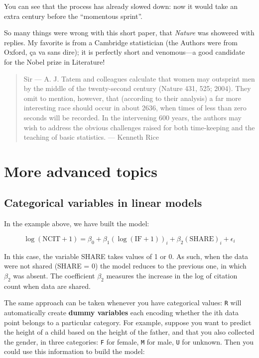 \documentclass[
  letterpaper,
  DIV=11,
  numbers=noendperiod]{scrreprt}
\begin{document}
You can see that the process has already slowed down: now it would take
an extra century before the ``momentous sprint''.

So many things were wrong with this short paper, that \emph{Nature} was
showered with replies. My favorite is from a Cambridge statistician (the
Authors were from Oxford, ça va sans dire); it is perfectly short and
venomous---a good candidate for the Nobel prize in Literature!

\begin{quote}
Sir --- A. J. Tatem and colleagues calculate that women may outsprint
men by the middle of the twenty-second century (Nature 431, 525; 2004).
They omit to mention, however, that (according to their analysis) a far
more interesting race should occur in about 2636, when times of less
than zero seconds will be recorded. In the intervening 600 years, the
authors may wish to address the obvious challenges raised for both
time-keeping and the teaching of basic statistics. --- Kenneth Rice
\end{quote}

\section{More advanced topics}\label{more-advanced-topics}

\subsection{Categorical variables in linear
models}\label{categorical-variables-in-linear-models}

In the example above, we have built the model:

\[
 \log(\text{NCIT} + 1) = \beta_0 + \beta_1 (\log(\text{IF} + 1))_i + \beta_2 (\text{SHARE})_i + \epsilon_i
\]

In this case, the variable SHARE takes values of 1 or 0. As such, when
the data were not shared (SHARE = 0) the model reduces to the previous
one, in which \(\beta_2\) was absent. The coefficient \(\beta_2\)
measures the increase in the log of citation count when data are shared.

The same approach can be taken whenever you have categorical values:
\texttt{R} will automatically create \textbf{dummy variables} each
encoding whether the ith data point belongs to a particular category.
For example, suppose you want to predict the height of a child based on
the height of the father, and that you also collected the gender, in
three categories: \texttt{F} for female, \texttt{M} for male, \texttt{U}
for unknown. Then you could use this information to build the model:
\end{document}
